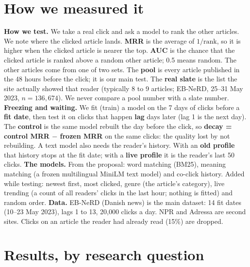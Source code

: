 \documentclass[11pt,a4paper]{article}
\newcommand{\term}[1]{\textbf{#1}}
\begin{document}
\section{How we measured it}
\textbf{How we test.} We take a real click and ask a model to rank the other articles. We note where the clicked article lands. \term{MRR} is the average of $1/\text{rank}$, so it is higher when the clicked article is nearer the top. \term{AUC} is the chance that the clicked article is ranked above a random other article; 0.5 means random. The other articles come from one of two sets. The \term{pool} is every article published in the 48 hours before the click; it is our main test. The \term{real slate} is the list the site actually showed that reader (typically 8 to 9 articles; EB-NeRD, 25--31 May 2023, $n=136{,}674$). We never compare a pool number with a slate number. \textbf{Freezing and waiting.} We fit (train) a model on the 7 days of clicks before a \term{fit date}, then test it on clicks that happen \term{lag} days later (lag 1 is the next day). The \term{control} is the same model rebuilt the day before the click, so \textbf{decay = control MRR $-$ frozen MRR} on the same clicks: the quality lost by not rebuilding. A text model also needs the reader's history. With an \term{old profile} that history stops at the fit date; with a \term{live profile} it is the reader's last 50 clicks. \textbf{The models.} From the proposal: word matching (BM25), meaning matching (a frozen multilingual MiniLM text model) and co-click history. Added while testing: newest first, most clicked, genre (the article's category), live trending (a count of all readers' clicks in the last hour; nothing is fitted) and random order. \textbf{Data.} EB-NeRD (Danish news) is the main dataset: 14 fit dates (10--23 May 2023), lags 1 to 13, 20{,}000 clicks a day. NPR and Adressa are second sites. Clicks on an article the reader had already read (15\%) are dropped.

\section{Results, by research question}
\end{document}
